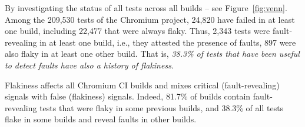 By investigating the status of all tests across all builds -- see Figure~\ref{fig:venn}. Among the 209,530 tests of the Chromium project, 24,820 have failed in at least one build, including 22,477 that were always flaky. Thus, 2,343 tests were fault-revealing in at least one build, i.e., they attested the presence of faults, 897 were also flaky in at least one other build. That is, \emph{38.3\% of tests that have been useful to detect faults have also a history of flakiness}.

\begin{tcolorbox}[
    left=2pt,right=2pt,top=2pt,bottom=2pt,
    arc=0pt,
    boxrule=1.2pt
]
Flakiness affects all Chromium CI builds and mixes critical (fault-revealing) signals with false (flakiness) signals. Indeed, 81.7\% of builds contain fault-revealing tests that were flaky in some previous builds, and 38.3\% of all tests flake in some builds and reveal faults in other builds. 
\end{tcolorbox}
